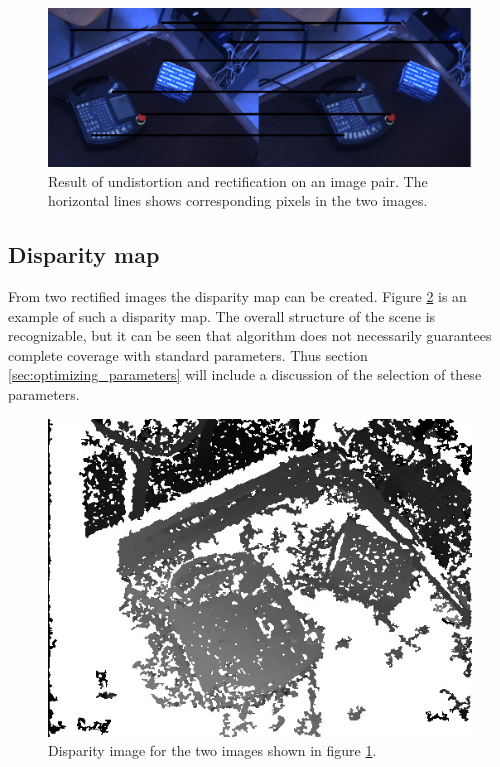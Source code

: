 \begin{figure}[h!]
  \centering
    \includegraphics[width=\textwidth]{graphics/06_vision/rectified.jpg}
      \caption{Result of undistortion and rectification on an image pair. The horizontal lines shows corresponding pixels in the two images.}
    \label{fig:rectified}
\end{figure}

\subsection{Disparity map}

From two rectified images the disparity map can be created. Figure \ref{fig:disparity} is an example of such a disparity map. The overall structure of the scene is recognizable, but it can be seen that algorithm does not necessarily guarantees complete coverage with standard parameters. Thus section \ref{sec:optimizing_parameters} will include a discussion of the selection of these parameters.

\begin{figure}[h!]
   \centering
    \includegraphics[scale=0.4]{graphics/06_vision/disparity_example.jpg}
    \caption{Disparity image for the two images shown in figure \ref{fig:rectified}. }
    \label{fig:disparity}
\end{figure}



